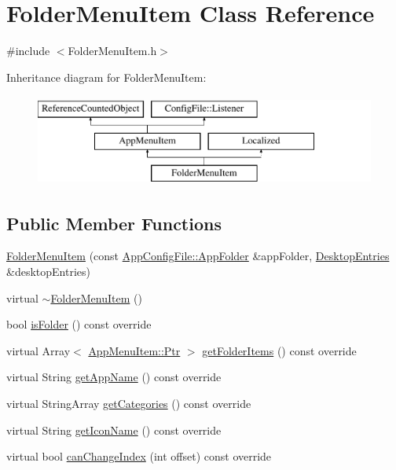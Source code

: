 \hypertarget{classFolderMenuItem}{}\section{Folder\+Menu\+Item Class Reference}
\label{classFolderMenuItem}


{\ttfamily \#include $<$Folder\+Menu\+Item.\+h$>$}

Inheritance diagram for Folder\+Menu\+Item\+:\begin{figure}[H]
\begin{center}
\leavevmode
\includegraphics[height=3.000000cm]{classFolderMenuItem}
\end{center}
\end{figure}
\subsection*{Public Member Functions}
\begin{DoxyCompactItemize}
\item 
\mbox{\hyperlink{classFolderMenuItem_aa9047739dfc7d9a9c4a88403e2ad416e}{Folder\+Menu\+Item}} (const \mbox{\hyperlink{structAppConfigFile_1_1AppFolder}{App\+Config\+File\+::\+App\+Folder}} \&app\+Folder, \mbox{\hyperlink{classDesktopEntries}{Desktop\+Entries}} \&desktop\+Entries)
\item 
virtual \mbox{\hyperlink{classFolderMenuItem_a2052273d4ba80b0bb922a936a41b3f85}{$\sim$\+Folder\+Menu\+Item}} ()
\item 
bool \mbox{\hyperlink{classFolderMenuItem_a04f57be51d2e79ca6d5e8ed5cdff7815}{is\+Folder}} () const override
\item 
virtual Array$<$ \mbox{\hyperlink{classAppMenuItem_ab5f51c5d74f8df62b8862c0cc8126cb7}{App\+Menu\+Item\+::\+Ptr}} $>$ \mbox{\hyperlink{classFolderMenuItem_af3b9473a335da9e3cb6ceccbb78c3ea6}{get\+Folder\+Items}} () const override
\item 
virtual String \mbox{\hyperlink{classFolderMenuItem_a82ec3210cc211f59b414275dfd60ccb1}{get\+App\+Name}} () const override
\item 
virtual String\+Array \mbox{\hyperlink{classFolderMenuItem_ae9026a329e1b9e6111354802624328f5}{get\+Categories}} () const override
\item 
virtual String \mbox{\hyperlink{classFolderMenuItem_a0f78f25c3d73abbb3179613b1f40467b}{get\+Icon\+Name}} () const override
\item 
virtual bool \mbox{\hyperlink{classFolderMenuItem_a61111b596d78f912bc1573c1ee1d356f}{can\+Change\+Index}} (int offset) const override
\end{DoxyCompactItemize}
